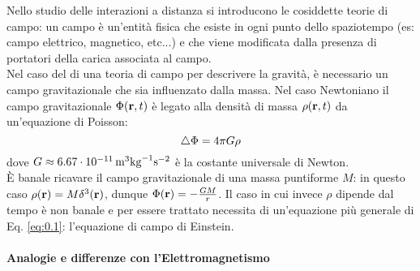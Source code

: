 
Nello studio delle interazioni a distanza si introducono le cosiddette teorie di campo: un campo è un'entità fisica che esiste in ogni punto dello spaziotempo (es: campo elettrico, magnetico, etc...) e che viene modificata dalla presenza di portatori della carica associata al campo.\\
Nel caso del di una teoria di campo per descrivere la gravità, è necessario un campo gravitazionale che sia influenzato dalla massa. Nel caso Newtoniano il campo gravitazionale $ \Phi(\mathbf{r},t) $ è legato alla densità di massa $ \rho(\mathbf{r},t) $ da un'equazione di Poisson:
\begin{equation}
  \triangle\Phi = 4\pi G \rho
  \label{eq:0.1}
\end{equation}
dove $ G \approx 6.67\cdot10^{-11}\,\mathrm{m}^3\text{kg}^{-1}\text{s}^{-2} $ è la costante universale di Newton.\\
È banale ricavare il campo gravitazionale di una massa puntiforme $ M $: in questo caso $ \rho(\mathbf{r}) = M \delta^3(\mathbf{r}) $, dunque $ \Phi(\mathbf{r}) = - \frac{GM}{r} $. Il caso in cui invece $ \rho $ dipende dal tempo è non banale e per essere trattato necessita di un'equazione più generale di Eq. \ref{eq:0.1}: l'equazione di campo di Einstein.

\paragraph{Analogie e differenze con l'Elettromagnetismo}


